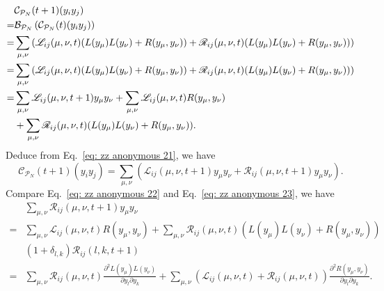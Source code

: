 \documentclass[journal=jctcce,a4paper,manuscript=article]{achemso}
\begin{document}
\begin{align}
    & \mathcal{C}_{\mathcal{P}_N} (t+1) (y_i y_j)                                                                                                                             \\
  = & \mathcal{B}_{\mathcal{P}_N}\left(\mathcal{C}_{\mathcal{P}_N} (t) (y_i y_j)\right)                                                                                                             \\
  = & \sum_{\mu,\nu} \left(\mathscr{L}_{ij} (\mu, \nu, t) (L(y_\mu) L(y_\nu) + R(y_\mu, y_\nu)) + \mathscr{R}_{ij} (\mu, \nu, t) (L(y_\mu) L(y_\nu) + R(y_\mu, y_\nu))\right) \\
  = & \sum_{\mu,\nu} \left(\mathscr{L}_{ij} (\mu, \nu, t) (L(y_\mu) L(y_\nu) + R(y_\mu, y_\nu)) + \mathscr{R}_{ij} (\mu, \nu, t) (L(y_\mu) L(y_\nu) + R(y_\mu, y_\nu))\right) \\
  = & \sum_{\mu,\nu} \mathscr{L}_{ij} (\mu, \nu, t+1) y_\mu y_\nu +  \sum_{\mu,\nu}\mathscr{L}_{ij} (\mu, \nu, t) R(y_\mu, y_\nu) \nonumber                                   \\
    & + \sum_{\mu,\nu}\mathscr{R}_{ij} (\mu, \nu, t) (L(y_\mu) L(y_\nu) + R(y_\mu, y_\nu)).
  \label{eq: zz anonymous 22}
\end{align}
Deduce from Eq.~\eqref{eq: zz anonymous 21}, we have
\begin{equation}
  \label{eq: zz anonymous 23}
  \mathcal{C}_{\mathcal{P}_N} (t+1) (y_i y_j)
  =\sum_{\mu,\nu} \left(\mathscr{L}_{ij} (\mu, \nu, t+1) y_\mu y_\nu + \mathscr{R}_{ij} (\mu, \nu, t+1) y_\mu y_\nu\right).
\end{equation}
Compare Eq.~\eqref{eq: zz anonymous 22} and Eq.~\eqref{eq: zz anonymous 23}, we have
\begin{align}
    & \sum_{\mu,\nu} \mathscr{R}_{ij} (\mu, \nu, t+1) y_\mu y_\nu                                                                                                                                                                                                            \\
  = & \sum_{\mu,\nu}\mathscr{L}_{ij} (\mu, \nu, t) R(y_\mu, y_\nu) + \sum_{\mu,\nu}\mathscr{R}_{ij} (\mu, \nu, t) (L(y_\mu) L(y_\nu) + R(y_\mu, y_\nu))                                                                                                                      \\
    & (1+ \delta_{l,k})  \mathscr{R}_{ij} (l, k, t+1)                                                                                                                                                                                                                        \\
  = & \sum_{\mu,\nu}\mathscr{R}_{ij} (\mu, \nu, t) \frac{\partial^2L(y_\mu) L(y_\nu)}{\partial y_l \partial y_k} + \sum_{\mu,\nu}\left( \mathscr{L}_{ij} (\mu, \nu, t) + \mathscr{R}_{ij} (\mu, \nu, t) \right)\frac{\partial^2 R(y_\mu, y_\nu)}{\partial y_l \partial y_k}.
  \label{eq: strict recursive relation}
\end{align}
\end{document}
